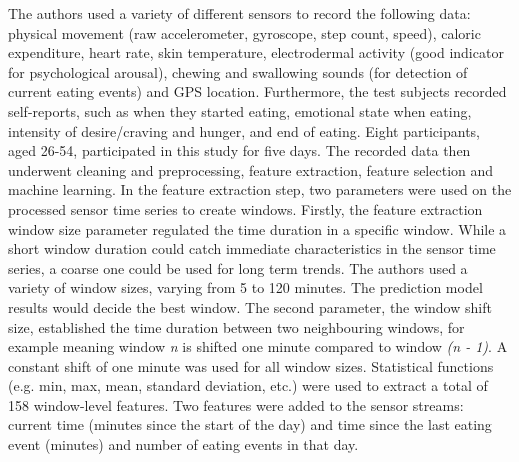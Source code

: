 The authors used a variety of different sensors to record the following data: physical movement (raw accelerometer, gyroscope, step count, speed), caloric expenditure, heart rate, skin temperature, electrodermal activity (good indicator for psychological arousal), chewing and swallowing sounds (for detection of current eating events) and GPS location. Furthermore, the test subjects recorded self-reports, such as when they started eating, emotional state when eating, intensity of desire/craving and hunger, and end of eating. Eight participants, aged 26-54, participated in this study for five days. The recorded data then underwent cleaning and preprocessing, feature extraction, feature selection and machine learning. 
In the feature extraction step, two parameters were used on the processed sensor time series to create windows. Firstly, the feature extraction window size parameter regulated the time duration in a specific window. While a short window duration could catch immediate characteristics in the sensor time series, a coarse one could be used for long term trends. The authors used a variety of window sizes, varying from 5 to 120 minutes. The prediction model results would decide the best window. The second parameter, the window shift size, established the time duration between two neighbouring windows, for example meaning window \textit{n} is shifted one minute compared to window \textit{(n - 1)}. A constant shift of one minute was used for all window sizes. Statistical functions (e.g. min, max, mean, standard deviation, etc.) were used to extract a total of 158 window-level features. Two features were added to the sensor streams: current time (minutes since the start of the day) and time since the last eating event (minutes) and number of eating events in that day.


